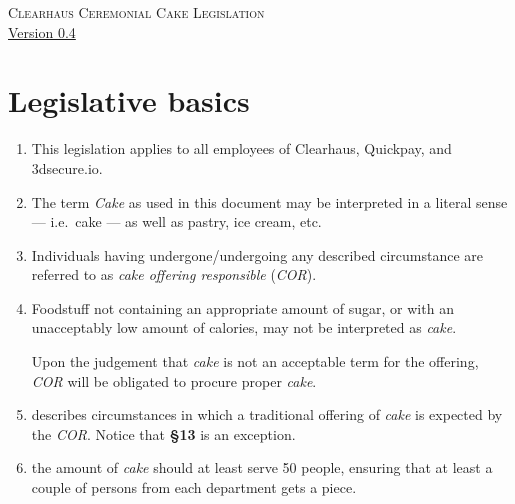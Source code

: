 \documentclass[a4paper, oneside, article]{memoir}
\newcounter{tbc}
\begin{document}
\thispagestyle{empty} %
\begin{center}
  \textsc{\huge Clearhaus Ceremonial Cake Legislation}
  \\
  {\footnotesize \href{https://semver.org/}{Version 0.4}}
\end{center}

\chapter{Legislative basics}

\begin{enumerate}[§ 1]
  \item This legislation applies to all employees of Clearhaus, Quickpay, and 3dsecure.io.


  \item The term \emph{Cake} as used in this document may be
    interpreted in a literal sense --- i.e.\ cake --- as well as pastry, ice
    cream, etc.

  \item Individuals having undergone/undergoing any described circumstance are
    referred to as \emph{cake offering responsible} (\emph{COR}).

  \item Foodstuff not containing an appropriate amount of sugar, or with an
    unacceptably low amount of calories, may not be interpreted as
    \emph{cake}.

    Upon the judgement that \emph{cake} is not an acceptable term for the
    offering, \emph{COR} will be obligated to procure proper \emph{cake}.

  \item {} describes circumstances in which a traditional
    offering of \emph{cake} is expected by the \emph{COR}. Notice that
    \textbf{§13} is an exception.
    
  \item the amount of \emph{cake} should at least serve 50 people, ensuring that at least a couple of persons from each department gets a piece.


  \setcounter{tbc}{\value{enumi}}
\end{enumerate}
\end{document}
